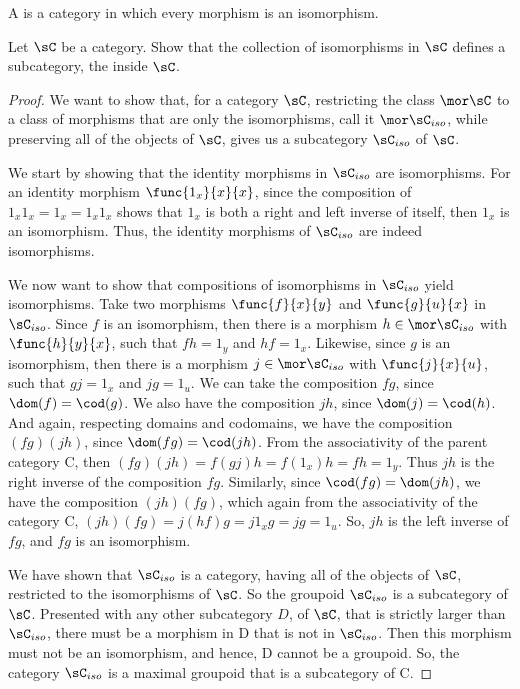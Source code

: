 \documentclass[main.tex]{subfiles}
\begin{document}
\begin{definition}
	A  is a category in which every morphism is an isomorphism.
\end{definition}
\popthm

\begin{exercise}
	Let \(\sC\) be a category. Show that the collection of isomorphisms in
	\(\sC\) defines a subcategory, the  inside \(\sC\).
\end{exercise}

\begin{proof}
	We want to show that, for a category \(\sC\), restricting the class
	\(\mor\sC\) to a class of morphisms that are only the isomorphisms, call it
	\(\mor\sC_{iso}\), while preserving all of the objects of \(\sC\), gives us
	a subcategory \(\sC_{iso}\) of \(\sC\).

	We start by showing that the identity morphisms in \(\sC_{iso}\) are
	isomorphisms. For an identity morphism \(\func{1_x}{x}{x}\), since the
	composition of \(1_x1_x=1_x=1_x1_x\) shows that \(1_x\) is both a right and
	left inverse of itself, then \(1_x\) is an isomorphism. Thus, the identity
	morphisms of \(\sC_{iso}\) are indeed isomorphisms.

	We now want to show that compositions of isomorphisms in \(\sC_{iso}\) yield
	isomorphisms. Take two morphisms \(\func{f}{x}{y}\) and \(\func{g}{u}{x}\)
	in \(\sC_{iso}\). Since \(f\) is an isomorphism, then there is a morphism
	\(h\in\mor\sC_{iso}\) with \(\func{h}{y}{x}\), such that \(fh=1_y\) and
	\(hf=1_x\). Likewise, since \(g\) is an isomorphism, then there is a
	morphism \(j\in\mor\sC_{iso}\) with \(\func{j}{x}{u}\), such that \(gj=1_x\)
	and \(jg=1_u\). We can take the composition \(fg\), since
	\(\dom(f)=\cod(g)\). We also have the composition \(jh\), since
	\(\dom(j)=\cod(h)\). And again, respecting domains and codomains, we have
	the composition \((fg)(jh)\), since \(\dom(fg)=\cod(jh)\). From the
	associativity of the parent category C, then
	\((fg)(jh)=f(gj)h=f(1_x)h=fh=1_y\). Thus \(jh\) is the right inverse of the
	composition \(fg\). Similarly, since \(\cod(fg)=\dom(jh)\), we have the
	composition \((jh)(fg)\), which again from the associativity of the category
	C, \((jh)(fg)=j(hf)g=j1_xg=jg=1_u\). So, \(jh\) is the left inverse of
	\(fg\), and \(fg\) is an isomorphism.

	We have shown that \(\sC_{iso}\) is a category, having all of the objects of
	\(\sC\), restricted to the isomorphisms of \(\sC\). So the groupoid \(\sC_{iso}\) is a
	subcategory of \(\sC\). Presented with any other subcategory \(D\), of \(\sC\), that is
	strictly larger than \(\sC_{iso}\), there must be a morphism in D that is
	not in \(\sC_{iso}\). Then this morphism must not be an isomorphism, and
	hence, D cannot be a groupoid. So, the category \(\sC_{iso}\) is a maximal
	groupoid that is a subcategory of C.
\end{proof}
\end{document}
